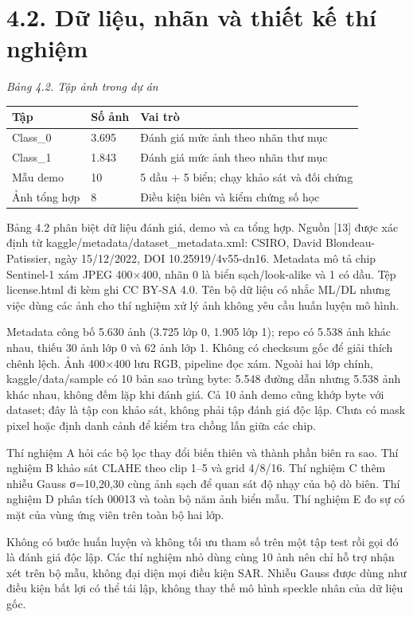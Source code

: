 \documentclass[13pt,a4paper]{extreport}
\begin{document}
\section*{4.2. Dữ liệu, nhãn và thiết kế thí nghiệm}
\noindent\textit{Bảng 4.2. Tập ảnh trong dự án}
\begin{longtable}{p{4.87cm}|p{4.87cm}|p{4.87cm}}
Tập & Số ảnh & Vai trò\\\hline
Class\_0 & 3.695 & Đánh giá mức ảnh theo nhãn thư mục\\\hline
Class\_1 & 1.843 & Đánh giá mức ảnh theo nhãn thư mục\\\hline
Mẫu demo & 10 & 5 dầu + 5 biển; chạy khảo sát và đối chứng\\\hline
Ảnh tổng hợp & 8 & Điều kiện biên và kiểm chứng số học\\\hline
\end{longtable}
Bảng 4.2 phân biệt dữ liệu đánh giá, demo và ca tổng hợp. Nguồn [13] được xác định từ kaggle/metadata/dataset\_metadata.xml: CSIRO, David Blondeau-Patissier, ngày 15/12/2022, DOI 10.25919/4v55-dn16. Metadata mô tả chip Sentinel-1 xám JPEG 400×400, nhãn 0 là biển sạch/look-alike và 1 có dầu. Tệp license.html đi kèm ghi CC BY-SA 4.0. Tên bộ dữ liệu có nhắc ML/DL nhưng việc dùng các ảnh cho thí nghiệm xử lý ảnh không yêu cầu huấn luyện mô hình.
\par
Metadata công bố 5.630 ảnh (3.725 lớp 0, 1.905 lớp 1); repo có 5.538 ảnh khác nhau, thiếu 30 ảnh lớp 0 và 62 ảnh lớp 1. Không có checksum gốc để giải thích chênh lệch. Ảnh 400×400 lưu RGB, pipeline đọc xám. Ngoài hai lớp chính, kaggle/data/sample có 10 bản sao trùng byte: 5.548 đường dẫn nhưng 5.538 ảnh khác nhau, không đếm lặp khi đánh giá. Cả 10 ảnh demo cũng khớp byte với dataset; đây là tập con khảo sát, không phải tập đánh giá độc lập. Chưa có mask pixel hoặc định danh cảnh để kiểm tra chồng lấn giữa các chip.
\par
Thí nghiệm A hỏi các bộ lọc thay đổi biến thiên và thành phần biên ra sao. Thí nghiệm B khảo sát CLAHE theo clip 1–5 và grid 4/8/16. Thí nghiệm C thêm nhiễu Gauss σ=10,20,30 cùng ảnh sạch để quan sát độ nhạy của bộ dò biên. Thí nghiệm D phân tích 00013 và toàn bộ năm ảnh biển mẫu. Thí nghiệm E đo sự có mặt của vùng ứng viên trên toàn bộ hai lớp.
\par
Không có bước huấn luyện và không tối ưu tham số trên một tập test rồi gọi đó là đánh giá độc lập. Các thí nghiệm nhỏ dùng cùng 10 ảnh nên chỉ hỗ trợ nhận xét trên bộ mẫu, không đại diện mọi điều kiện SAR. Nhiễu Gauss được dùng như điều kiện bất lợi có thể tái lập, không thay thế mô hình speckle nhân của dữ liệu gốc.
\par
\clearpage
\end{document}
